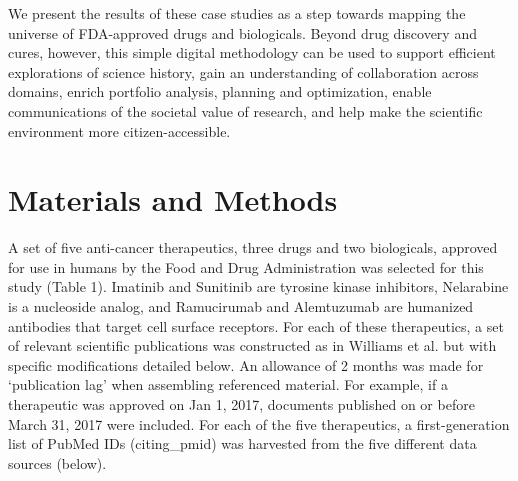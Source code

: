 \documentclass[10pt,letterpaper]{article}
\begin{document}
We present the results of these case studies as a step towards mapping the universe of FDA-approved drugs and biologicals. Beyond drug discovery and cures, however, this simple digital methodology can be used to support efficient explorations of science history, gain an understanding of collaboration across domains, enrich portfolio analysis, planning and optimization, enable communications of the societal value of research, and help make the scientific environment more citizen-accessible. 

\section*{Materials and Methods} 
A set of five anti-cancer therapeutics, three drugs and two biologicals, approved for use in humans by the Food and Drug Administration was selected for this study (Table 1). Imatinib and Sunitinib are tyrosine kinase inhibitors, Nelarabine is a nucleoside analog, and Ramucirumab and Alemtuzumab are humanized antibodies that target cell surface receptors. 
 For each of these therapeutics, a set of relevant scientific publications was constructed as in Williams et al.\cite{bib1} but with specific modifications detailed below. An allowance of 2 months was made for `publication lag' when assembling referenced material. For example, if a therapeutic was approved on Jan 1, 2017, documents published  on or before March 31, 2017 were included. For each of the five therapeutics, a first-generation list of PubMed IDs (citing\_pmid) was harvested from the five different data sources (below).  
\end{document}
